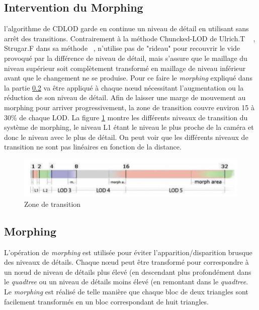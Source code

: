 \subsection{Intervention du Morphing}
\label{subsec:interventionMorphing}
    l'algorithme de CDLOD garde en continue un niveau de détail en utilisant sans arrêt des transitions. Contrairement à la méthode Chuncked-LOD de Ulrich.T ~\cite{CLOD} , Strugar.F dans sa méthode ~\cite{CDLOD}, n'utilise pas de "rideau" pour recouvrir le vide provoqué par la différence de niveau de détail, mais s'assure que le maillage du niveau supérieur soit complètement transformé en maillage de niveau inférieur avant que le changement ne se produise. Pour ce faire le \emph{morphing} expliqué dans la partie \ref{subsec:morphing} va être appliqué à chaque n\oe{}ud nécessitant l'augmentation ou la réduction de son niveau de détail. Afin de laisser une marge de mouvement au morphing pour arriver progressivement, la zone de transition couvre environ 15 à 30\% de chaque LOD. La figure \ref{fig:morph-area} montre les différents niveaux de transition du système de morphing, le niveau L1 étant le niveau le plus proche de la caméra et donc le niveau avec le plus de détail. On peut voir que les différents niveaux de transition ne sont pas linéaires en fonction de la distance.
\begin{figure}[!ht]
    \includegraphics[width=12cm]{img/morph-area.png}
    \caption[morph-area]{Zone de transition \protect\footnotemark}
    \label{fig:morph-area}
\end{figure}

\subsection{Morphing}
\label{subsec:morphing}

  L'opération de \emph{morphing} est utilisée pour éviter l'apparition/disparition brusque des niveaux de détails. Chaque n\oe{}ud peut être transformé pour correspondre à un n\oe{}ud de niveau de détails plus élevé (en descendant plus profondément dans le \emph{quadtree} ou un niveau de détails moins élevé (en remontant dans le \emph{quadtree}. Le \emph{morphing} est réalisé de telle manière que chaque bloc de deux triangles sont  facilement transformés en un bloc correspondant de huit triangles. 
  
